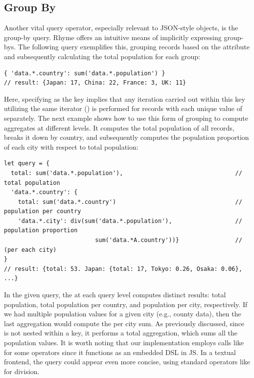 \documentclass[runningheads]{llncs}
\newcommand{\lang}{Rhyme}
\begin{document}
\vspace{-3mm}
\subsection{Group By}\label{subsec:groupby}
\vspace{-2mm}
Another vital query operator, especially relevant to JSON-style objects,
is the group-by query.
\lang{} offers an intuitive means of implicitly expressing group-bys.
The following query exemplifies this, grouping records based on the
 attribute and subsequently calculating the total population
for each group:

\begin{lstlisting}[style=JavaScript, columns=flexible, numbers=none]
{ 'data.*.country': sum('data.*.population') }
// result: {Japan: 17, China: 22, France: 3, UK: 11}
\end{lstlisting}

Here, specifying  as the key implies
that any iteration carried out within this key utilizing the same
iterator (\inline{*}) is performed for records with each unique value of 
separately.
The next example shows how to use this form of grouping to compute aggregates at different
levels.
It computes the total population of all records, breaks it down by country,
and subsequently computes the population proportion of each city with respect to total
population:

\begin{lstlisting}[style=JavaScript, columns=flexible, numbers=none]
let query = { 
  total: sum('data.*.population'),                                // total population
  'data.*.country': {
    total: sum('data.*.country')                                  // population per country
    'data.*.city': div(sum('data.*.population'),                  // population proportion
                          sum('data.*A.country'))}                // (per each city)
}
// result: {total: 53. Japan: {total: 17, Tokyo: 0.26, Osaka: 0.06}, ...}
\end{lstlisting}

In the given query, the  at each query level computes
distinct results: total population, total population per country, and population per city,
respectively. 
If we had multiple population values for a given city (e.g., county data), then the
last aggregation would compute the per city sum.
As previously discussed, since  is not nested within a
 key, it performs a total aggregation, which sums all the population values.
It is worth noting that our implementation employs calls like  for some operators
since it functions as an embedded DSL in JS.
In a textual frontend, the query could appear even more concise, using standard operators 
like \inline{/} for division.
\end{document}
